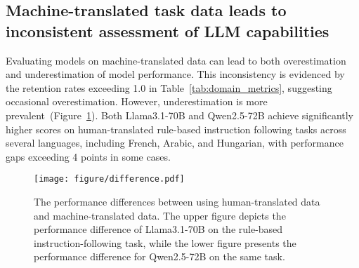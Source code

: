 \subsection{Machine-translated task data leads to inconsistent assessment of LLM capabilities}
Evaluating models on machine-translated data can lead to both overestimation and underestimation of model performance.
This inconsistency is evidenced by the retention rates exceeding 1.0 in Table~\ref{tab:domain_metrics}, suggesting occasional overestimation.
However, underestimation is more prevalent~(Figure~\ref{fig:difference}).
Both Llama3.1-70B and Qwen2.5-72B achieve significantly higher scores on human-translated rule-based instruction following tasks across several languages, including French, Arabic, and Hungarian, with performance gaps exceeding 4 points in some cases.
\begin{figure}[t]
    \centering
    \texttt{[image: figure/difference.pdf]}
    \caption{The performance differences between using human-translated data and machine-translated data. The upper figure depicts the performance difference of Llama3.1-70B on the rule-based instruction-following task, while the lower figure presents the performance difference for Qwen2.5-72B on the same task.}
    \label{fig:difference}
    \vskip -0.2in
\end{figure}



